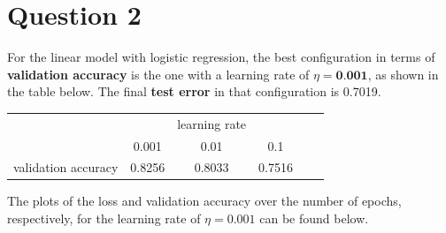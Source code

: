 \begin{questions}
\begin{parts}
            
            

        \end{parts}

    \end{questions}

    \section*{Question 2}

    \begin{questions}
        \question %
        For the linear model with logistic regression, the best configuration in terms of \textbf{validation accuracy} is the one with 
 a learning rate of $\eta = \textbf{0.001}$, as shown in the table below. The final \textbf{test error} in that configuration is 0.7019.
        
        \begin{table}[h!]
            \centering
            \begin{tabular}{c|ccccc}
                                &                                     & learning rate                      &                 &  &  \\ \cline{2-4}
                                & \multicolumn{1}{c|}{0.001}          & \multicolumn{1}{c|}{0.01}          & 0.1             &  &  \\ \cline{1-4}
            validation accuracy & \multicolumn{1}{c|}{0.8256} & \multicolumn{1}{c|}{0.8033} & 0.7516 &  & 
            \end{tabular}
        \end{table}

    \newpage

        The plots of the loss and validation accuracy over the number of epochs, respectively, for the learning rate of $\eta = 0.001$ can be found below.


\end{questions}
